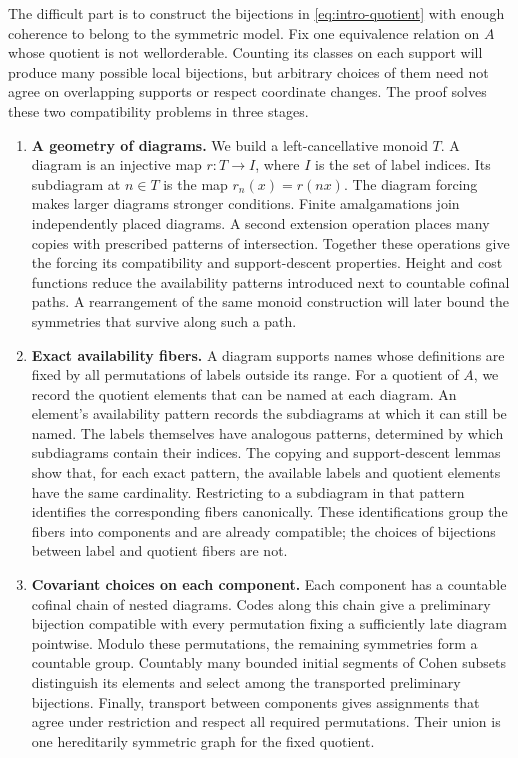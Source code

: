The difficult part is to construct the bijections in
\eqref{eq:intro-quotient} with enough coherence to belong to the symmetric
model. Fix one equivalence relation on $A$ whose quotient is not
wellorderable. Counting its classes on
each support will produce many possible local bijections, but arbitrary
choices of them need not agree on overlapping supports or respect
coordinate changes. The proof solves these two compatibility problems
in three stages.

\begin{enumerate}[leftmargin=*,label=\arabic*.]
\item \textbf{A geometry of diagrams.}
We build a left-cancellative monoid $T$. A diagram is an injective map
$r:T\to I$, where $I$ is the set of label indices. Its subdiagram at $n\in T$
is the map $r_n(x)=r(nx)$. The diagram forcing makes larger diagrams
stronger conditions. Finite amalgamations join independently placed
diagrams. A second extension operation places many copies with prescribed
patterns of intersection. Together these operations give the forcing its
compatibility and support-descent properties. Height and cost functions
reduce the availability patterns introduced next to countable cofinal
paths. A rearrangement of the same monoid construction will later bound
the symmetries that survive along such a path.

\item \textbf{Exact availability fibers.}
A diagram supports names whose definitions are fixed by all permutations
of labels outside its range. For a quotient of $A$, we record the quotient
elements that can be named at each diagram. An element's availability
pattern records the subdiagrams at which it can still be named.
The labels themselves have analogous patterns, determined by which
subdiagrams contain their indices. The copying and support-descent lemmas
show that, for each exact pattern, the available labels and quotient
elements have the same cardinality. Restricting to a subdiagram in that
pattern identifies the corresponding fibers canonically. These
identifications group the fibers into components and are already
compatible; the choices of bijections between label and quotient fibers
are not.

\item \textbf{Covariant choices on each component.}
Each component has a countable cofinal chain of nested diagrams. Codes
along this chain give a preliminary bijection compatible with every
permutation fixing a sufficiently late diagram pointwise. Modulo these
permutations, the remaining symmetries form a countable group. Countably
many bounded initial segments of Cohen subsets distinguish its elements
and select among the transported preliminary bijections. Finally,
transport between components gives assignments that agree under
restriction and respect all required permutations. Their union is one
hereditarily symmetric graph for the fixed quotient.
\end{enumerate}

